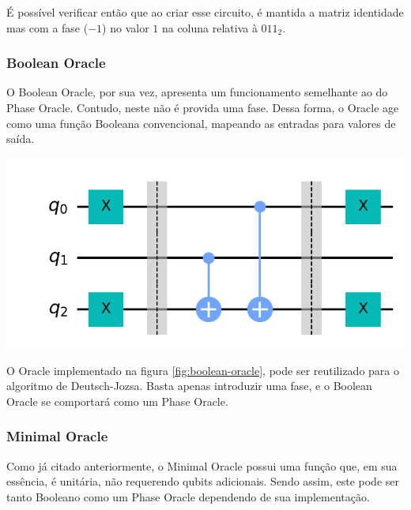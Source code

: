 \documentclass{article}
\begin{document}
É possível verificar então que ao criar esse circuito, é mantida a matriz identidade mas com a fase ($-1$) no valor $1$ na coluna relativa à $011_{2}$. 


\subsubsection{Boolean Oracle}

O Boolean Oracle, por sua vez, apresenta um funcionamento semelhante ao do Phase Oracle. Contudo, neste não é provida uma fase. Dessa forma, o Oracle age como uma função Booleana convencional, mapeando as entradas para valores de saída.

\begin{center}
	\includegraphics[scale=0.3]{balanced-oracle.png}
	\label{fig:boolean-oracle}
\end{center}

O Oracle implementado na figura \ref{fig:boolean-oracle}, pode ser reutilizado para o algoritmo de Deutsch-Jozsa. Basta apenas introduzir uma fase, e o Boolean Oracle se comportará como um Phase Oracle.

\subsubsection{Minimal Oracle}

Como já citado anteriormente, o Minimal Oracle possui uma função que, em sua essência, é unitária, não requerendo qubits adicionais. Sendo assim, este pode ser tanto Booleano como um Phase Oracle dependendo de sua implementação.
\end{document}
